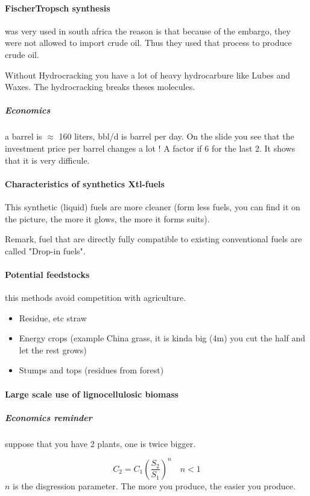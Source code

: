 \documentclass[10pt,a4paper]{article}
\begin{document}
\paragraph{FischerTropsch synthesis} was very used in south africa the reason is that because of the embargo, they were not allowed to import crude oil. Thus they used that process to produce crude oil.

Without Hydrocracking you have a lot of heavy hydrocarbure like Lubes and Waxes. The hydrocracking breaks theses molecules.

\subparagraph{Economics} a barrel is $\approx$ 160 liters, bbl/d is barrel per day. On the slide you see that the investment price per barrel changes a lot ! A factor if 6 for the last 2. It shows that it is very difficule.

\paragraph{Characteristics of synthetics Xtl-fuels}
This synthetic (liquid) fuels are more cleaner (form less fuels, you can find it on the picture, the more it glows, the more it forms suits).

Remark, fuel that are directly fully compatible to existing conventional fuels are called "Drop-in fuels".

\paragraph{Potential feedstocks} this methods avoid competition with agriculture.

\begin{itemize}
\item Residue, etc straw
\item Energy crops (example China grass, it is kinda big (4m) you cut the half and let the rest grows)
\item Stumps and tops (residues from forest)
\end{itemize}

\paragraph{Large scale use of lignocellulosic biomass}

\subparagraph{Economics reminder} suppose that you have 2 plants, one is twice bigger.

\[ C_2 = C_1 \left(\frac{S_2}{S_1} \right)^n \quad n < 1 \]
$n$ is the disgression parameter. The more you produce, the easier you produce.
\end{document}
